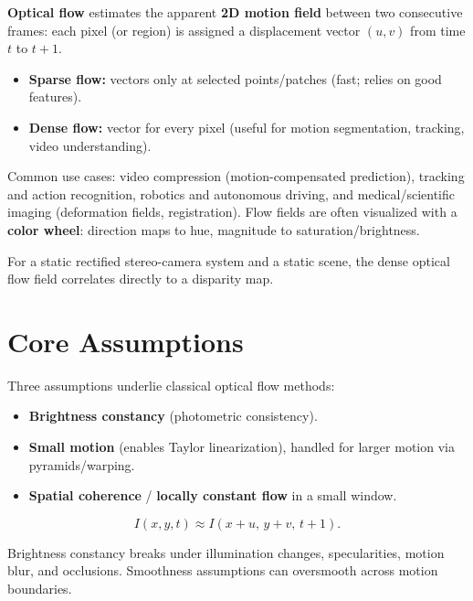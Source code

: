 \documentclass[11pt, oneside]{book}
\begin{document}
\begin{thmbox}[title={Reprojection Error Minimization}]
\begin{defbox}[title={Correlation and Convolution}]
\begin{defbox}[title={ReLU and Pooling}]
\begin{defbox}[title={Segmentation}]
\begin{defbox}[title={Graph-Based Segmentation}]
\begin{defbox}[title={U-Net}]
\begin{defbox}[title={Optical Flow}]
\textbf{Optical flow} estimates the apparent \textbf{2D motion field} between two consecutive frames:
each pixel (or region) is assigned a displacement vector $(u,v)$ from time $t$ to $t+1$.
\begin{itemize}
  \item \textbf{Sparse flow:} vectors only at selected points/patches (fast; relies on good features).
  \item \textbf{Dense flow:} vector for every pixel (useful for motion segmentation, tracking, video understanding).
\end{itemize}
\end{defbox}

Common use cases: video compression (motion-compensated prediction), tracking and action recognition,
robotics and autonomous driving, and medical/scientific imaging (deformation fields, registration).
Flow fields are often visualized with a \textbf{color wheel}: direction maps to hue, magnitude to saturation/brightness.

\begin{notebox}[title={Stereo Connection}]
For a static rectified stereo-camera system and a static scene, the dense optical flow field correlates directly to a disparity map.
\end{notebox}

\section{Core Assumptions}

Three assumptions underlie classical optical flow methods:
\begin{itemize}
  \item \textbf{Brightness constancy} (photometric consistency).
  \item \textbf{Small motion} (enables Taylor linearization), handled for larger motion via pyramids/warping.
  \item \textbf{Spatial coherence} / \textbf{locally constant flow} in a small window.
\end{itemize}

\begin{defbox}[title={Brightness Constancy}]
\[
I(x,y,t)\approx I(x+u,\,y+v,\,t+1).
\]
\end{defbox}

Brightness constancy breaks under illumination changes, specularities, motion blur, and occlusions.
Smoothness assumptions can oversmooth across motion boundaries.


\end{defbox}
\end{defbox}
\end{defbox}
\end{defbox}
\end{defbox}
\end{thmbox}
\end{document}
